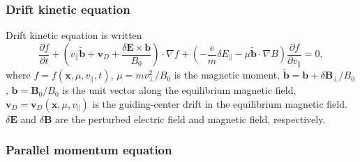 \documentclass{llncs}
\begin{document}
\

\

\subsubsection{Drift kinetic equation}

Drift kinetic equation is written
\begin{equation}
  \frac{\partial f}{\partial t} + \left( v_{\parallel} \tilde{\mathbf{b}}
  +\mathbf{v}_D + \frac{\delta \mathbf{E} \times \mathbf{b}}{B_0} \right)
  \cdot \nabla f + \left( - \frac{e}{m} \delta E_{\parallel} - \mu
  \tilde{\mathbf{b}} \cdot \nabla B \right) \frac{\partial f}{\partial
  v_{\parallel}} = 0,
\end{equation}
where $f = f (\mathbf{x}, \mu, v_{\parallel}, t)$, $\mu = m v_{\perp}^2 / B_0$
is the magnetic moment, $\tilde{\mathbf{b}} =\mathbf{b}+ \delta
\mathbf{B}_{\perp} / B_0$, $\mathbf{b}=\mathbf{B}_0 / B_0$ is the unit vector
along the equilibrium magnetic field, $\mathbf{v}_D =\mathbf{v}_D (\mathbf{x},
\mu, v_{\parallel})$ is the guiding-center drift in the equilibrium magnetic
field. $\delta \mathbf{E}$ and $\delta \mathbf{B}$ are the perturbed electric
field and magnetic field, respectively.

\subsubsection{Parallel momentum equation}
\end{document}
